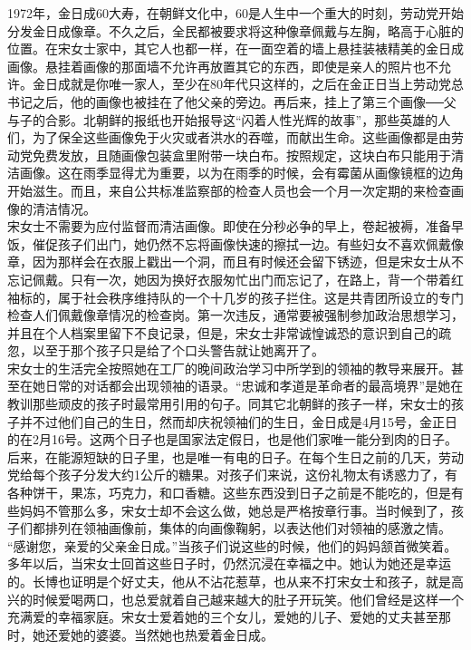 1972年，金日成60大寿，在朝鲜文化中，60是人生中一个重大的时刻，劳动党开始分发金日成像章。不久之后，全民都被要求将这种像章佩戴与左胸，略高于心脏的位置。在宋女士家中，其它人也都一样，在一面空着的墙上悬挂装裱精美的金日成画像。悬挂着画像的那面墙不允许再放置其它的东西，即使是亲人的照片也不允许。金日成就是你唯一家人，至少在80年代只这样的，之后在金正日当上劳动党总书记之后，他的画像也被挂在了他父亲的旁边。再后来，挂上了第三个画像──父与子的合影。北朝鲜的报纸也开始报导这“闪着人性光辉的故事”，那些英雄的人们，为了保全这些画像免于火灾或者洪水的吞噬，而献出生命。这些画像都是由劳动党免费发放，且随画像包装盒里附带一块白布。按照规定，这块白布只能用于清洁画像。这在雨季显得尤为重要，以为在雨季的时候，会有霉菌从画像镜框的边角开始滋生。而且，来自公共标准监察部的检查人员也会一个月一次定期的来检查画像的清洁情况。\\

宋女士不需要为应付监督而清洁画像。即使在分秒必争的早上，卷起被褥，准备早饭，催促孩子们出门，她仍然不忘将画像快速的擦拭一边。有些妇女不喜欢佩戴像章，因为那样会在衣服上戳出一个洞，而且有时候还会留下锈迹，但是宋女士从不忘记佩戴。只有一次，她因为换好衣服匆忙出门而忘记了，在路上，背一个带着红袖标的，属于社会秩序维持队的一个十几岁的孩子拦住。这是共青团所设立的专门检查人们佩戴像章情况的检查岗。第一次违反，通常要被强制参加政治思想学习，并且在个人档案里留下不良记录，但是，宋女士非常诚惶诚恐的意识到自己的疏忽，以至于那个孩子只是给了个口头警告就让她离开了。\\

宋女士的生活完全按照她在工厂的晚间政治学习中所学到的领袖的教导来展开。甚至在她日常的对话都会出现领袖的语录。“忠诚和孝道是革命者的最高境界”是她在教训那些顽皮的孩子时最常用引用的句子。同其它北朝鲜的孩子一样，宋女士的孩子并不过他们自己的生日，然而却庆祝领袖们的生日，金日成是4月15号，金正日的在2月16号。这两个日子也是国家法定假日，也是他们家唯一能分到肉的日子。后来，在能源短缺的日子里，也是唯一有电的日子。在每个生日之前的几天，劳动党给每个孩子分发大约1公斤的糖果。对孩子们来说，这份礼物太有诱惑力了，有各种饼干，果冻，巧克力，和口香糖。这些东西没到日子之前是不能吃的，但是有些妈妈不管那么多，宋女士却不会这么做，她总是严格按章行事。当时候到了，孩子们都排列在领袖画像前，集体的向画像鞠躬，以表达他们对领袖的感激之情。\\

“感谢您，亲爱的父亲金日成。”当孩子们说这些的时候，他们的妈妈颔首微笑着。\\

多年以后，当宋女士回首这些日子时，仍然沉浸在幸福之中。她认为她还是幸运的。长博也证明是个好丈夫，他从不沾花惹草，也从来不打宋女士和孩子，就是高兴的时候爱喝两口，也总爱就着自己越来越大的肚子开玩笑。他们曾经是这样一个充满爱的幸福家庭。宋女士爱着她的三个女儿，爱她的儿子、爱她的丈夫甚至那时，她还爱她的婆婆。当然她也热爱着金日成。\\

